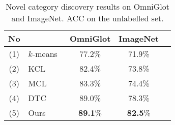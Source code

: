 \begin{table}[t]
 \centering
\caption{Novel category discovery results on OmniGlot and ImageNet. ACC on the unlabelled set.
}\label{tab:comparison_omniglot_imagenet}
  \begin{tabular}[c]{clccc}
    \toprule
    No  &                                      & OmniGlot        & ImageNet \\
    \midrule
    (1) & $k$-means~\cite{MackQueen67_Kmeans} & 77.2\%          & 71.9\%   \\
    (2) & KCL~\cite{Hsu18_L2C}                & 82.4\%          & 73.8\%  \\
    (3) & MCL~\cite{Hsu19_MCL}                & 83.3\%          & 74.4\%  \\
    (4) & DTC~\cite{han2019learning}          & 89.0\%          & 78.3\% \\\midrule
    (5) & Ours                                 & \textbf{89.1}\% & \textbf{82.5}\% \\
    \bottomrule
  \end{tabular}
  \hfill

\end{table}

